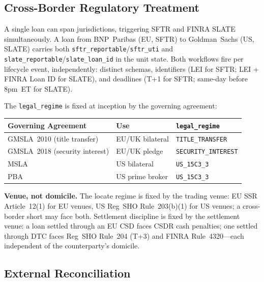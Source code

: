 \subsection{Cross-Border Regulatory Treatment}
\label{sec:sbl-crossborder}

A single loan can span jurisdictions, triggering SFTR and FINRA SLATE simultaneously. A loan from BNP~Paribas (EU, SFTR) to Goldman~Sachs (US, SLATE) carries both \texttt{sftr\_reportable}\slash\allowbreak\texttt{sftr\_uti} and\allowbreak{} \texttt{slate\_reportable}\slash\allowbreak\texttt{slate\_loan\_id} in the unit state. Both workflows fire per lifecycle event, independently: distinct schemas, identifiers (LEI for SFTR; LEI + FINRA Loan ID for SLATE), and deadlines (T+1 for SFTR; same-day before 8pm~ET for SLATE).

The \texttt{legal\_regime} is fixed at inception by the governing agreement:

\begin{center}\small
\begin{tabular}{l l l}
\toprule
\textbf{Governing Agreement} & \textbf{Use} & \textbf{\texttt{legal\_regime}} \\
\midrule
GMSLA~2010 (title transfer) & EU/UK bilateral & \texttt{TITLE\_TRANSFER} \\
GMSLA~2018 (security interest) & EU/UK pledge & \texttt{SECURITY\_INTEREST} \\
MSLA & US bilateral & \texttt{US\_15C3\_3} \\
PBA & US prime broker & \texttt{US\_15C3\_3} \\
\bottomrule
\end{tabular}
\end{center}

\noindent\textbf{Venue, not domicile.} The locate regime is fixed by the trading venue: EU SSR Article~12(1) for EU venues, US Reg~SHO Rule~203(b)(1) for US venues; a cross-border short may face both. Settlement discipline is fixed by the settlement venue: a loan settled through an EU CSD faces CSDR cash penalties; one settled through DTC faces Reg~SHO Rule~204 (T+3) and FINRA Rule~4320---each independent of the counterparty's domicile.

\subsection{External Reconciliation}
\label{sec:sbl-external}

